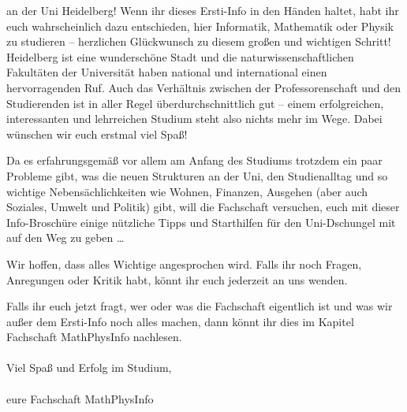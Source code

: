 an der Uni Heidelberg! Wenn ihr dieses Ersti-Info in den Händen haltet, habt ihr euch wahrscheinlich dazu entschieden, hier Informatik, Mathematik oder Physik zu studieren -- herzlichen Glückwunsch zu diesem großen und wichtigen Schritt! Heidelberg ist eine wunderschöne Stadt und die naturwissenschaftlichen Fakultäten der Universität haben national und international einen hervorragenden Ruf. Auch das Verhältnis zwischen der Professorenschaft und den Studierenden ist in aller Regel überdurchschnittlich gut -- einem erfolgreichen, interessanten und lehrreichen Studium steht also nichts mehr im Wege. Dabei wünschen wir euch erstmal viel Spaß! \smiley

Da es erfahrungsgemäß vor allem am Anfang des Studiums trotzdem ein paar Probleme gibt, was die neuen Strukturen an der Uni, den Studienalltag und so wichtige Nebensächlichkeiten wie Wohnen, Finanzen, Ausgehen (aber auch Soziales, Umwelt und Politik) gibt, will die Fachschaft versuchen, euch mit dieser Info-Broschüre einige nützliche Tipps und Starthilfen für den Uni-Dschungel mit auf den Weg zu geben \dots


Wir hoffen, dass alles Wichtige angesprochen wird. Falls ihr noch Fragen, Anregungen oder Kritik habt, könnt ihr euch jederzeit an uns wenden.

Falls ihr euch jetzt fragt, wer oder was die Fachschaft eigentlich ist und was wir außer dem Ersti-Info noch alles machen, dann könnt ihr dies im Kapitel Fachschaft MathPhysInfo nachlesen. \\\\
\noindent Viel Spaß und Erfolg im Studium,\\\\

eure Fachschaft MathPhysInfo
